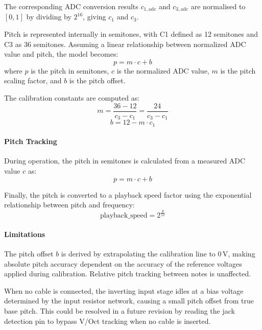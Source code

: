 The corresponding ADC conversion results $c_{1,\mathrm{adc}}$ and $c_{3,\mathrm{adc}}$ are normalised to $[0,1]$ by dividing by $2^{16}$, giving $c_1$ and $c_3$.

Pitch is represented internally in semitones, with
C1 defined as 12 semitones and C3 as 36 semitones.
Assuming a linear relationship between normalized ADC value and pitch, the model becomes:
\begin{equation}
p = m \cdot c + b
\end{equation}
where \( p \) is the pitch in semitones, \( c \) is the normalized ADC value,
\( m \) is the pitch scaling factor, and \( b \) is the pitch offset.

The calibration constants are computed as:
\begin{equation}
m = \frac{36 - 12}{c_3 - c_1} = \frac{24}{c_3 - c_1}
\end{equation}
\begin{equation}
b = 12 - m \cdot c_1
\end{equation}

\paragraph{Pitch Tracking}


During operation, the pitch in semitones is calculated from a measured ADC value \( c \) as:
\begin{equation}
p = m \cdot c + b
\end{equation}

Finally, the pitch is converted to a playback speed factor using the exponential
relationship between pitch and frequency:
\begin{equation}
\text{playback\_speed} = 2^{\frac{p}{12}}
\end{equation}

\paragraph{Limitations}
The pitch offset $b$ is derived by extrapolating the calibration line to 0\,V, making absolute pitch accuracy dependent on the accuracy of the reference voltages applied during calibration. 
Relative pitch tracking between notes is unaffected.

When no cable is connected, the inverting input stage idles at a bias voltage determined by the input resistor network, causing a small pitch offset from true base pitch.
This could be resolved in a future revision by reading the jack detection pin to bypass V/Oct tracking when no cable is inserted.